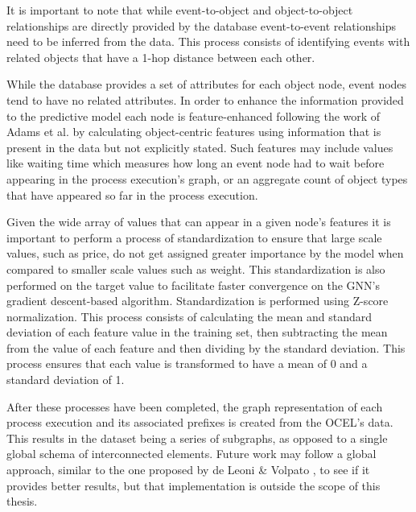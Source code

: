     It is important to note that while event-to-object and object-to-object relationships are directly provided by the database event-to-event relationships need to be inferred from the data. This process consists of identifying events with related objects that have a 1-hop distance between each other.

    While the database provides a set of attributes for each object node, event nodes tend to have no related attributes. In order to enhance the information provided to the predictive model each node is feature-enhanced following the work of Adams et al. \cite{adams2022} by calculating object-centric features using information that is present in the data but not explicitly stated. Such features may include values like waiting time which measures how long an event node had to wait before appearing in the process execution's graph, or an aggregate count of object types that have appeared so far in the process execution. 

    Given the wide array of values that can appear in a given node's features it is important to perform a process of standardization to ensure that large scale values, such as price, do not get assigned greater importance by the model when compared to smaller scale values such as weight. This standardization is also performed on the target value to facilitate faster convergence on the GNN's gradient descent-based algorithm. Standardization is performed using Z-score normalization. This process consists of calculating the mean and standard deviation of each feature value in the training set, then subtracting the mean from the value of each feature and then dividing by the standard deviation. This process ensures that each value is transformed to have a mean of 0 and a standard deviation of 1.

    After these processes have been completed, the graph representation of each process execution and its associated prefixes is created from the OCEL's data. This results in the dataset being a series of subgraphs, as opposed to a single global schema of interconnected elements. Future work may follow a global approach, similar to the one proposed by de Leoni \& Volpato \cite{deleonieVolpato}, to see if it provides better results, but that implementation is outside the scope of this thesis.


